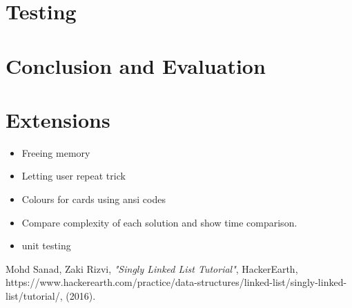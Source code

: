 \documentclass[11]{article}
\begin{document}
	\section{Testing}
	
	\section{Conclusion and Evaluation}
	
	\section{Extensions}
		\begin{itemize}
			\item Freeing memory
			\item Letting user repeat trick
			\item Colours for cards using ansi codes
			\item Compare complexity of each solution and show time comparison.
			\item unit testing
		\end{itemize}
		
	\begin{thebibliography}{1}
  		 Mohd Sanad, Zaki Rizvi, \textit{"Singly Linked List Tutorial"}, HackerEarth, https://www.hackerearth.com/practice/data-structures/linked-list/singly-linked-list/tutorial/, (2016).
  	\end{thebibliography}
		
\end{document}
